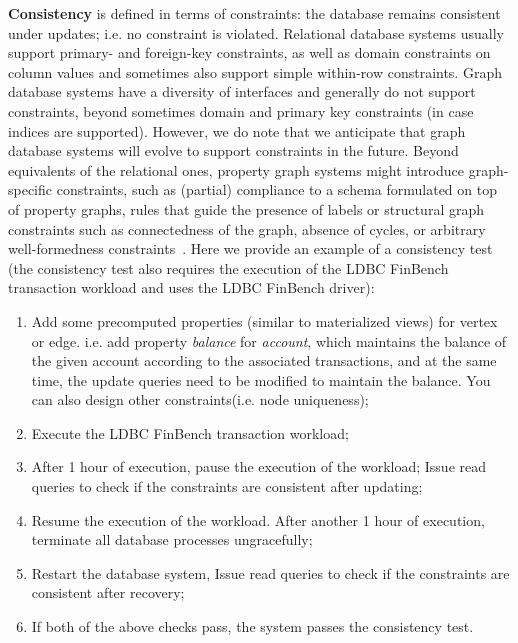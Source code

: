 {\bf Consistency} is defined in terms of constraints: the database remains
consistent under updates; i.e. no constraint is violated. Relational database
systems usually support primary- and foreign-key constraints, as well as domain
constraints on column values and sometimes also support simple within-row
constraints. Graph database systems have a diversity of interfaces and generally
do not support constraints, beyond sometimes domain and primary key constraints
(in case indices are supported). However, we do note that we anticipate that
graph database systems will evolve to support constraints in the future. Beyond
equivalents of the relational ones, property graph systems might introduce
graph-specific constraints, such as (partial) compliance to a schema formulated
on top of property graphs, rules that guide the presence of labels or structural
graph constraints such as connectedness of the graph, absence of cycles, or
arbitrary well-formedness constraints~\cite{DBLP:journals/sosym/SemerathBHSV17}.
Here we provide an example of a consistency test (the consistency test also
requires the execution of the LDBC FinBench transaction workload and uses the
LDBC FinBench driver):

\begin{enumerate}[label={(\roman*)}]
  \item Add some precomputed properties (similar to materialized views) for vertex
        or edge. i.e. add property \emph{balance} for \emph{account}, which
        maintains the balance of the given account according to the associated
        transactions, and at the same time, the update queries need to be modified
        to maintain the balance. You can also design other constraints(i.e. node
        uniqueness);
  \item Execute the LDBC FinBench transaction workload;
  \item After 1 hour of execution, pause the execution of the workload;
        Issue read queries to check if the constraints are consistent after
        updating;
  \item Resume the execution of the workload. After another 1 hour of execution,
        terminate all database processes ungracefully;
  \item Restart the database system, Issue read queries to check if the
        constraints are consistent after recovery;
  \item If both of the above checks pass, the system passes the
        consistency test.
\end{enumerate}
